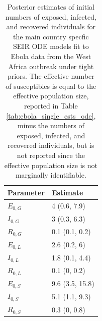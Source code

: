 \begin{table}[htbp]
	\caption[Posterior estimates of initial numbers of exposed, infected, and recovered individuals for country--specific SEIR ODE models fit to Ebola outbreak data.]{Posterior estimates of initial numbers of exposed, infected, and recovered individuals for the main country specfic SEIR ODE models fit to Ebola data from the West Africa outbreak under tight priors. The effective number of susceptibles is equal to the effective population size, reported in Table \ref{tab:ebola_single_ests_ode}, minus the numbers of exposed, infected, and recovered individuals, but is not reported since the effective population size is not marginally identifiable.}
	\label{tab:ebola_single_initdist_res_ode}
	\centering
	\begin{tabular}{ll}
		\hline
		\textbf{Parameter} & \textbf{Estimate }\\ 
		\hline
		$ E_{0,G} $& 4 (0.6, 7.9) \\ 
		$ I_{0,G} $& 3 (0.3, 6.3) \\ 
		$ R_{0,G} $& 0.1 (0.1, 0.2) \\ 
		\hline
		$ E_{0,L} $& 2.6 (0.2, 6) \\ 
		$ I_{0,L} $& 1.8 (0.1, 4.4) \\ 
		$ R_{0,L} $& 0.1 (0, 0.2) \\
		\hline
		$ E_{0,S} $& 9.6 (3.5, 15.8) \\ 
		$ I_{0,S} $& 5.1 (1.1, 9.3) \\  
		$ R_{0,S} $& 0.3 (0, 0.8) \\ 
		\hline
	\end{tabular}
\end{table}

